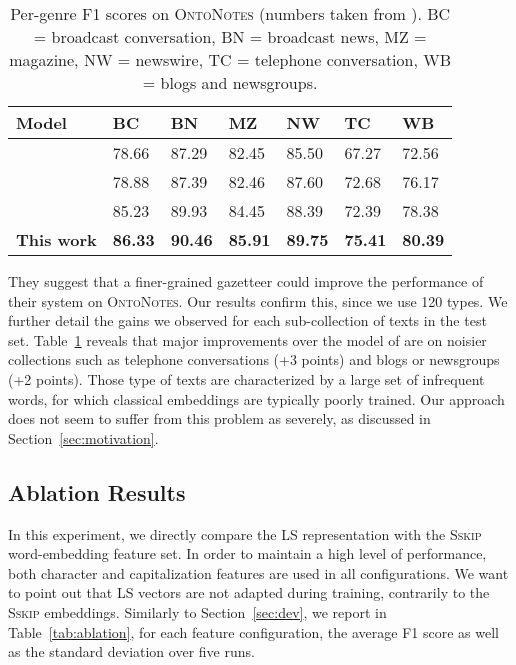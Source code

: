 \documentclass[11pt]{article}
\newcommand{\onto}{\textsc{OntoNotes}}
\newcommand{\sskip}{\textsc{Sskip}}
\newcommand{\lr}{\textsc{LS}}
\begin{document}
	\begin{table}[!h]
		\setlength{\tabcolsep}{2mm} 
		\begin{center}
			\begin{tabular}{|l|l|l|l|l|l|l|}
				\hline \bf Model & \bf BC & \bf BN & \bf MZ & \bf NW & \bf TC  & \bf WB \\
				\hline
				\cite{finkel2009joint} & 78.66 & 87.29 & 82.45 & 85.50 & 67.27 & 72.56 \\
				\cite{durrett2014joint} & 78.88 & 87.39 & 82.46 & 87.60 & 72.68 & 76.17 \\
				\cite{chiu2015named} & 85.23 & 89.93 & 84.45 & 88.39 & 72.39 & 78.38 \\
				\hline
				\textbf{This work} & \bf 86.33 & \bf 90.46 & \bf 85.91 & \bf 89.75 & \bf 75.41 & \bf 80.39 \\
				\hline
			\end{tabular}
		\end{center}
		
		\caption{Per-genre F1 scores on \onto{} (numbers taken from ). BC = broadcast conversation, BN = broadcast news, MZ = magazine, NW = newswire, TC = telephone conversation, WB = blogs and newsgroups.}
		\label{tab:onto.genre} 
		
	\end{table}	
	
	
	They suggest that a finer-grained gazetteer could improve the performance of their system on \onto. Our results confirm this, since we use 120 types. We further detail the gains we observed for each sub-collection of texts in the test set. Table~\ref{tab:onto.genre} reveals that major improvements over the model of \cite{chiu2015named} are on noisier collections such as telephone conversations (+3 points) and blogs or newsgroups (+2 points). Those type of texts are characterized by a large set of infrequent words, for which classical embeddings are typically poorly trained. Our approach does not seem to suffer from this problem as severely, as discussed in Section~\ref{sec:motivation}. 
	
	\subsection{Ablation Results}
	In this experiment, we directly compare the \lr{} representation with the \sskip{} word-embedding feature set. In order to maintain a high level of performance, both character and capitalization features are used in all configurations. We want to point out that \lr{} vectors are not adapted during training, contrarily to the \sskip{} embeddings. Similarly to Section~\ref{sec:dev}, we report in Table~\ref{tab:ablation}, for each feature configuration, the average F1 score as well as the standard deviation over five runs.
	
\end{document}
